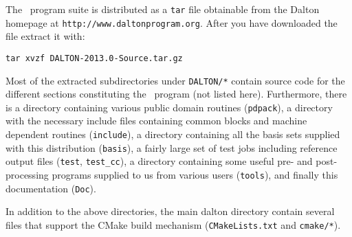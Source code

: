 The \latestrelease\ program suite is distributed as a \verb|tar|
file obtainable from
the Dalton homepage at \verb|http://www.daltonprogram.org|.
After you have downloaded the file extract it with:
\begin{verbatim}
tar xvzf DALTON-2013.0-Source.tar.gz
\end{verbatim}
Most of the extracted subdirectories under \verb|DALTON/*| contain source code for the different
sections constituting the \dalton\ program (not listed here).
Furthermore, there is a
directory containing various public domain routines (\verb|pdpack|), a
directory with the necessary include files containing common blocks and machine
dependent routines (\verb|include|), a directory containing all the basis sets
supplied with this distribution (\verb|basis|), a fairly large set of test jobs
including reference output files (\verb|test|, \verb|test_cc|), a directory
containing some useful pre- and post-processing programs supplied to us from
various users (\verb|tools|), and finally this documentation (\verb|Doc|). 

In addition to the above directories, the main dalton directory contain several
files that support the CMake build mechanism (\verb|CMakeLists.txt| and \verb|cmake/*|).
